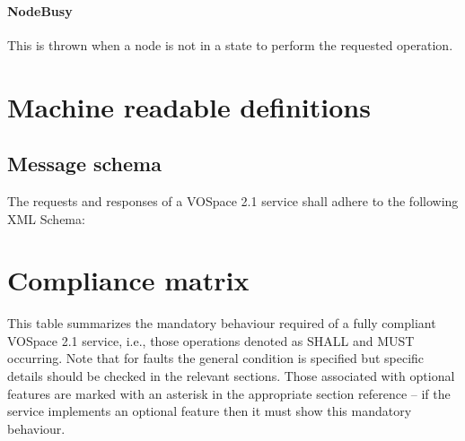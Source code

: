 \documentclass[11pt,a4paper]{ivoa}
\begin{document}
\paragraph{NodeBusy}
This is thrown when a node is not in a state to perform the requested operation.

\appendix

\section{Machine readable definitions}
\label{sec:machine readable definitions}
\subsection{Message schema}
\label{subsec:message schema}
The requests and responses of a VOSpace 2.1 service shall adhere to the following XML Schema:



\section{Compliance matrix}
\label{sec:compliance matrix}
This table summarizes the mandatory behaviour required of a fully compliant VOSpace 2.1 service, i.e., those operations denoted as SHALL and MUST occurring. Note that for faults the general condition is specified but specific details should be checked in the relevant sections. Those associated with optional features are marked with an asterisk in the appropriate section reference -- if the service implements an optional feature then it must show this mandatory behaviour.
\end{document}

